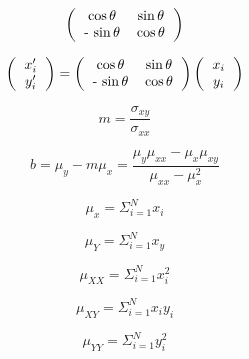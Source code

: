 \documentclass{article}
\newcommand{\meanx}{\ensuremath{\mu_{x}}}
\newcommand{\meany}{\ensuremath{\mu_{y}}}
\newcommand{\meanxx}{\ensuremath{\mu_{xx}}}
\newcommand{\meanxy}{\ensuremath{\mu_{xy}}}
\newcommand{\sxx}{\ensuremath{\sigma_{xx}}}
\newcommand{\sxy}{\ensuremath{\sigma_{xy}}}
\begin{document}
\begin{equation}
\left(
\begin{tabular}{cc}
$ \cos \theta$ & $\sin \theta$ \\
 - $\sin \theta$ & $\cos \theta$ \\
\end{tabular}
\right)
\end{equation}

\begin{equation}
\left(
\begin{tabular}{c}
$x_{i}^{\prime}$ \\
$y_{i}^{\prime}$
\end{tabular}
\right) = 
\left(
\begin{tabular}{cc}
$ \cos \theta$ & $\sin \theta$ \\
 - $\sin \theta$ & $\cos \theta$ \\
\end{tabular}
\right)
\left(
\begin{tabular}{c}
$x_{i}$ \\
$y_{i}$
\end{tabular}
\right)
\end{equation}

\begin{equation}
m = \frac{\sxy}{\sxx}
\end{equation}

\begin{equation}
b = \meany - m \meanx = \frac{\meany \meanxx - \meanx \meanxy}{\mu_{xx} - \mu_{x}^{2}}
\end{equation}

\begin{equation}
\meanx = \Sigma_{i=1}^{N} x_{i}
\end{equation}

\begin{equation}
\mu_{Y} = \Sigma_{i=1}^{N} x_{y}
\end{equation}

\begin{equation}
\mu_{XX} = \Sigma_{i=1}^{N} x_{i}^{2}
\end{equation}

\begin{equation}
\mu_{XY} = \Sigma_{i=1}^{N} x_{i} y_{i}
\end{equation}

\begin{equation}
\mu_{YY} = \Sigma_{i=1}^{N} y_{i}^{2}
\end{equation}
\end{document}
